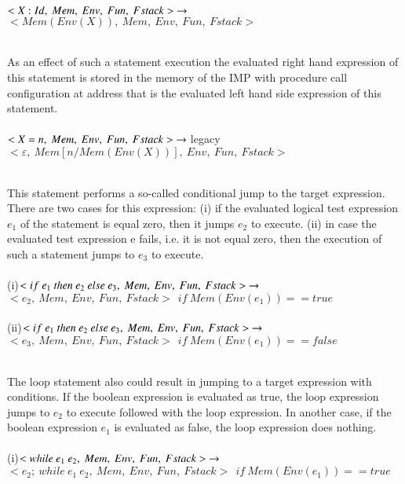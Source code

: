 \documentclass[letterpaper, 10 pt, conference]{IEEEtran}
\begin{document}
$<X:Id,~Mem,~Env,~Fun,~Fstack>~\rightarrow\\ \\$
$<Mem(Env(X)),~Mem,~Env,~Fun,~Fstack>$\\ \\
\par As an effect of such a statement execution the evaluated right hand
expression of this statement is stored in the memory of the IMP with procedure call configuration at
address that is the evaluated left hand side expression of this statement. \\ \\
$<X=n,~Mem,~Env,~Fun,~Fstack>~\rightarrow\\ \\$legacy
$<\varepsilon,~Mem[n/Mem(Env(X))],~Env,~Fun,~Fstack>$\\ \\
\par This statement performs a so-called conditional jump to the target expression. There are two cases for this expression: (i) if the evaluated logical test expression $e_1$
of the statement is equal zero, then it jumps $e_2$ to execute. (ii) in case the evaluated test expression e fails, i.e. it is not equal zero, then the
execution of such a statement jumps to $e_3$ to execute.\\ \\
(i)$<if~e_1~then~e_2~else~e_3,~Mem,~Env,~Fun,~Fstack>~\rightarrow\\ \\$
$<e_2,~Mem,~Env,~Fun,~Fstack>~~if~Mem(Env(e_1))==true$\\ \\
(ii)$<if~e_1~then~e_2~else~e_3,~Mem,~Env,~Fun,~Fstack>~\rightarrow\\ \\$
$<e_3,~Mem,~Env,~Fun,~Fstack>~~if~Mem(Env(e_1))==false$\\ \\
\par The loop statement also could result in jumping to a target expression with conditions. If the boolean expression is evaluated as true, the loop expression jumps to $e_2$ to execute followed with the loop expression. In another case, if the boolean expression $e_1$ is evaluated as false, the loop expression does nothing.\\ \\
(i)$<while~e_1~e_2,~Mem,~Env,~Fun,~Fstack>~\rightarrow\\ \\$
$<e_2;~while~e_1~e_2,~Mem,~Env,~Fun,~Fstack>~~if~Mem(Env(e_1))==true$\\ \\
\end{document}
